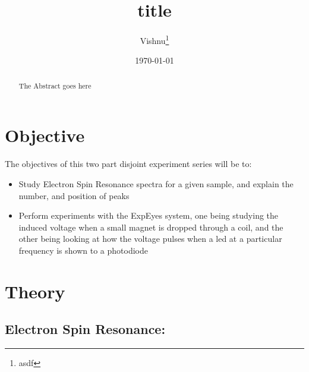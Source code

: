 \documentclass{double}
\begin{document}
\title{title}

\author{Vishnu\thanks{asdf}}
\date{\today}

\maketitle

\begin{abstract}

The Abstract goes here

\end{abstract}

\section{Objective}

The objectives of this two part disjoint experiment series will be to:

\begin{itemize}
\tightlist
\item
  Study Electron Spin Resonance spectra for a given sample, and explain the number, and position of peaks
\item
  Perform experiments with the ExpEyes system, one being studying the induced voltage when a small magnet is dropped through a coil, and the other being looking at how the voltage pulses when a led at a particular frequency is shown to a photodiode
\end{itemize}

\section{Theory}

\subsection{Electron Spin Resonance:}
\end{document}
